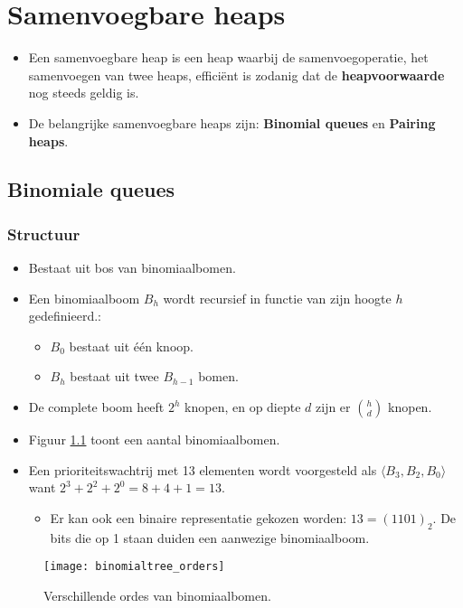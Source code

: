 \chapter{Samenvoegbare heaps}
\begin{itemize}
	\item Een samenvoegbare heap is een heap waarbij de samenvoegoperatie, het samenvoegen van twee heaps, efficiënt is zodanig dat de \textbf{heapvoorwaarde} nog steeds geldig is.
	\item De belangrijke samenvoegbare heaps zijn: \textbf{Binomial queues} en \textbf{Pairing heaps}.
\end{itemize}







\section{Binomiale queues}
\subsection{Structuur}
		\begin{itemize}
			\item Bestaat uit bos van binomiaalbomen.
			\item Een binomiaalboom $B_h$ wordt recursief in functie van zijn hoogte $h$ gedefinieerd.:
			\begin{itemize}
				\item $B_0$ bestaat uit één knoop.
				\item $B_{h}$ bestaat uit twee $B_{h - 1}$ bomen.
			\end{itemize}
			\item De complete boom heeft $2^h$ knopen, en op diepte $d$ zijn er $\binom{h}{d}$ knopen.
			\item Figuur \ref{fig:binomialtree_orders} toont een aantal binomiaalbomen.
			\item Een prioriteitswachtrij met 13 elementen wordt voorgesteld als $\langle B_3, B_2, B_0 \rangle$ want $2^3 + 2^2 + 2^0 = 8 + 4 + 1 = 13$.
			\begin{itemize}
				\item Er kan ook een binaire representatie gekozen worden: $13 = (1101)_2$. De bits die op 1 staan duiden een aanwezige binomiaalboom.
			\end{itemize}
		\end{itemize}
		\begin{figure}[ht]
			\centering
			\texttt{[image: binomialtree\_orders]}
			\caption{Verschillende ordes van binomiaalbomen.}
			\label{fig:binomialtree_orders}
		\end{figure}

